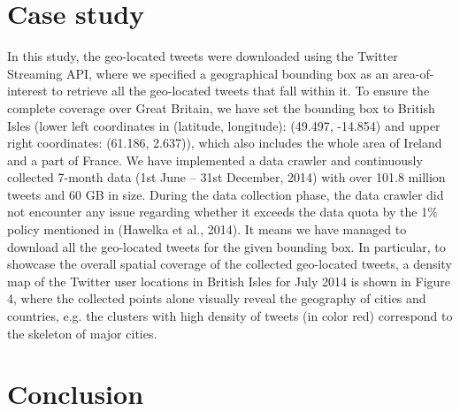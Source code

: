 \documentclass[a4paper,11pt]{article}
\begin{document}
\section*{Case study}
In this study, the geo-located tweets were downloaded using the Twitter Streaming API, where we specified a geographical bounding box as an area-of-interest to retrieve all the geo-located tweets that fall within it.
To ensure the complete coverage over Great Britain, we have set the bounding box to British Isles (lower left coordinates in (latitude, longitude): (49.497, -14.854) and upper right coordinates: (61.186, 2.637)), which also includes the whole area of Ireland and a part of France.
We have implemented a data crawler and continuously collected 7-month data (1st June – 31st December, 2014) with over 101.8 million tweets and 60 GB in size.
During the data collection phase, the data crawler did not encounter any issue regarding whether it exceeds the data quota by the 1$\%$ policy mentioned in (Hawelka et al., 2014).
It means we have managed to download all the geo-located tweets for the given bounding box.
In particular, to showcase the overall spatial coverage of the collected geo-located tweets, a density map of the Twitter user locations in British Isles for July 2014 is shown in Figure 4, where the collected points alone visually reveal the geography of cities and countries, e.g. the clusters with high density of tweets (in color red) correspond to the skeleton of major cities.

\cite{brockmann2006}

\section*{Conclusion}
\end{document}
